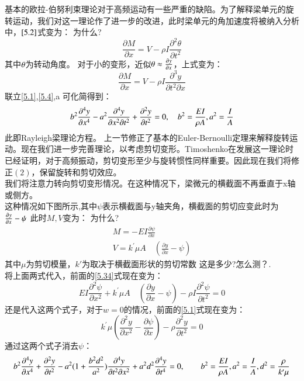 \documentclass[UTF8,9pt]{report}
\begin{document}
基本的欧拉-伯努利束理论对于高频运动有一些严重的缺陷。为了解释梁单元的旋转运动，我们对这一理论作了进一步的改进，此时梁单元的角加速度将被纳入分析中，$\ref{5.2}$式变为：{\color{red} 为什么?}
\begin{equation}
    \frac { \partial M } { \partial x } = V - \rho I \frac { \partial ^ { 2 } \theta } { \partial t ^ { 2 } } \label{5.34}
\end{equation}
其中$\theta$为转动角度。
对于小的变形，近似$\theta \approx \frac{\partial^{} y}{\partial x^{}}$，上式变为：
$$\frac { \partial M } { \partial x } = V - \rho I \frac { \partial ^ { 3 } y } { \partial t ^ { 2 } \partial x }$$
联立\ref{5.1},\ref{5.4},a
可化简得到：
\begin{equation}
    b ^ { 2 } \frac { \partial ^ { 4 } y } { \partial x ^ { 4 } } - a ^ { 2 } \frac { \partial ^ { 4 } y } { \partial x ^ { 2 } \partial t ^ { 2 } } + \frac { \partial ^ { 2 } y } { \partial t ^ { 2 } } = 0,\quad b^2=\frac{EI}{\rho A} ,a^2=\frac{I}{A} \label{5.36}
\end{equation}
此即Rayleigh梁理论方程。
上一节修正了基本的Euler-Bernoulli定理来解释旋转运动。现在我们进一步完善理论，以考虑剪切变形。Timoshenko在发展这一理论时已经证明，对于高频振动，剪切变形至少与旋转惯性同样重要。因此现在我们将修正$(2)$，保留旋转和剪切效应。\\
我们将注意力转向剪切变形情况。在这种情况下，梁微元的横截面不再垂直于x轴或侧方。\\
这种情况如下图所示,其中$\psi$表示横截面与y轴夹角，横截面的剪切应变此时为$\frac{\partial^{} y}{\partial x^{}}-\psi$
此时$M,V$变为：{\color{red} 为什么?}
$$\begin{array} { l } { M = - E I \frac { \partial \psi } { \partial x } } \\ { V = k ^ { \prime } \mu A \quad ( \frac { \partial y } { \partial x } - \psi ) } \end{array}$$
其中$\mu$为剪切模量，$k'$为取决于横截面形状的剪切常数  {\color{red}这是多少?怎么测？}.\\
将上面两式代入，前面的\ref{5.34}式现在变为：
$$EI\frac { \partial ^ { 2 } \psi } { \partial x ^ { 2 } } + k ^ { \prime } \mu A \quad ( \frac { \partial y } { \partial x } - \psi ) - \rho I \frac { \partial ^ { 2 } \psi } { \partial t ^ { 2 } } = 0$$
还是代入这两个式子，对于$w=0$的情况，前面的\ref{5.1}式现在变为：
$$k ^ { \prime } \mu ( \frac { \partial ^ { 2 } y } { \partial x ^ { 2 } } - \frac { \partial \psi } { \partial x } ) - \rho \frac { \partial ^ { 2 } y } { \partial t^ { 2 } } = 0$$
通过这两个式子消去$\psi$：
\begin{equation}
    b ^ { 2 } \frac { \partial ^ { 4 } y } { \partial x ^ { 4 } } + \frac { \partial ^ { 2 } y } { \partial t ^ { 2 } } - a ^ { 2 }( 1 + \frac { b ^ { 2 } d ^ { 2 } } { a ^ { 2 } }) \frac { \partial ^ { 4 } y } { \partial t ^ { 2 } \partial x ^ { 2 } } + a ^ { 2 } d ^ { 2 } \frac { \partial ^ { 4 } y } { \partial t ^ { 4 } } = 0 ,\qquad  b^2=\frac{EI}{\rho A} ,a^2=\frac{I}{A}, d^2=\frac{\rho}{k'\mu} \label{5.47}
\end{equation}
\end{document}
